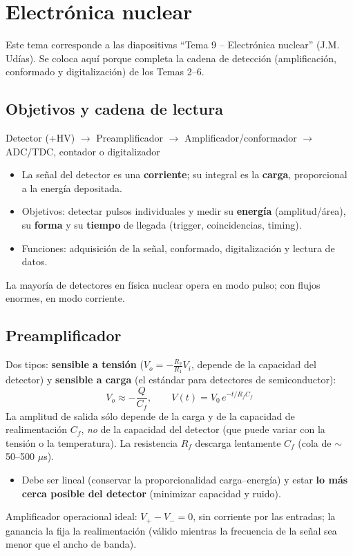 \chapter{Electrónica nuclear}
\begin{dato}
Este tema corresponde a las diapositivas ``Tema 9 -- Electrónica nuclear'' (J.M. Udías). Se coloca aquí porque completa
la cadena de detección (amplificación, conformado y digitalización) de los Temas 2--6.
\end{dato}

\section{Objetivos y cadena de lectura}
\begin{clave}
\begin{center}Detector (+HV) $\to$ Preamplificador $\to$ Amplificador/conformador $\to$ ADC/TDC, contador o digitalizador\end{center}
\begin{itemize}
\item La señal del detector es una \textbf{corriente}; su integral es la \textbf{carga}, proporcional a la energía depositada.
\item Objetivos: detectar pulsos individuales y medir su \textbf{energía} (amplitud/área), su \textbf{forma} y su \textbf{tiempo} de llegada (trigger, coincidencias, timing).
\item Funciones: adquisición de la señal, conformado, digitalización y lectura de datos.
\end{itemize}
\end{clave}
La mayoría de detectores en física nuclear opera en modo pulso; con flujos enormes, en modo corriente.

\section{Preamplificador}
\begin{clave}
Dos tipos: \textbf{sensible a tensión} ($V_o=-\frac{R_2}{R_1}V_i$, depende de la capacidad del detector) y
\textbf{sensible a carga} (el estándar para detectores de semiconductor):
\[ V_o\approx-\frac{Q}{C_f},\qquad V(t)=V_0\,e^{-t/R_fC_f} \]
La amplitud de salida sólo depende de la carga y de la capacidad de realimentación $C_f$, \emph{no} de la capacidad del
detector (que puede variar con la tensión o la temperatura). La resistencia $R_f$ descarga lentamente $C_f$ (cola de
$\sim$50--500 $\mu$s).
\begin{itemize}
\item Debe ser lineal (conservar la proporcionalidad carga--energía) y estar \textbf{lo más cerca posible del detector} (minimizar capacidad y ruido).
\end{itemize}
\end{clave}
Amplificador operacional ideal: $V_+-V_-=0$, sin corriente por las entradas; la ganancia la fija la realimentación (válido mientras la
frecuencia de la señal sea menor que el ancho de banda).

